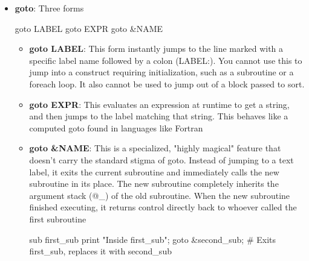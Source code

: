\documentclass{report}
\begin{document}
\begin{itemize}
\begin{perlcode}
                HTML
            \end{perlcode}
        \item \textbf{goto}: Three forms
            \begin{perlcode}
            goto LABEL
            goto EXPR
            goto &NAME
            \end{perlcode}
            \bigbreak \noindent 
            \begin{itemize}
                \item \textbf{goto LABEL}: This form instantly jumps to the line marked with a specific label name followed by a colon (LABEL:).
                    \bigbreak \noindent 
                    You cannot use this to jump into a construct requiring initialization, such as a subroutine or a foreach loop. It also cannot be used to jump out of a block passed to sort.
                \item \textbf{goto EXPR}: This evaluates an expression at runtime to get a string, and then jumps to the label matching that string. This behaves like a computed goto found in languages like Fortran
                    \bigbreak \noindent 
                \item \textbf{goto \&NAME}: This is a specialized, "highly magical" feature that doesn't carry the standard stigma of goto. Instead of jumping to a text label, it exits the current subroutine and immediately calls the new subroutine in its place.
                    \bigbreak \noindent 
                    The new subroutine completely inherits the argument stack (@\_) of the old subroutine. When the new subroutine finished executing, it returns control directly back to whoever called the first subroutine
                    \bigbreak \noindent 
                    \begin{perlcode}
                        sub first_sub {
                            print "Inside first_sub\n";
                            goto &second_sub; # Exits first_sub, replaces it with second_sub
                        }


\end{perlcode}
\end{itemize}
\end{itemize}
\end{document}
